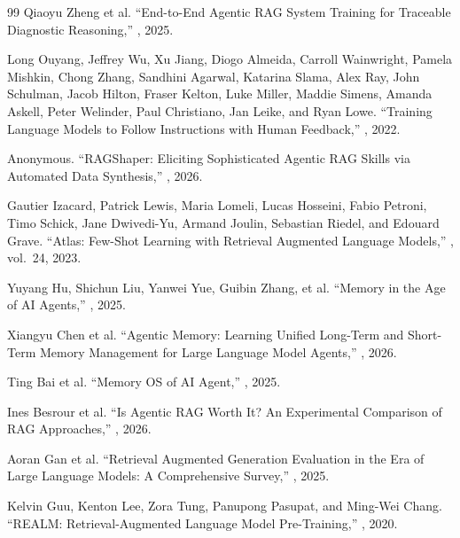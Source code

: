 \begin{thebibliography}{99}
Qiaoyu Zheng et al.
\newblock ``End-to-End Agentic RAG System Training for Traceable Diagnostic
Reasoning,''
, 2025.
 
Long Ouyang, Jeffrey Wu, Xu Jiang, Diogo Almeida, Carroll Wainwright,
Pamela Mishkin, Chong Zhang, Sandhini Agarwal, Katarina Slama, Alex Ray,
John Schulman, Jacob Hilton, Fraser Kelton, Luke Miller, Maddie Simens,
Amanda Askell, Peter Welinder, Paul Christiano, Jan Leike, and Ryan Lowe.
\newblock ``Training Language Models to Follow Instructions with Human Feedback,''
, 2022.
 
Anonymous.
\newblock ``RAGShaper: Eliciting Sophisticated Agentic RAG Skills via Automated
Data Synthesis,''
, 2026.
 
Gautier Izacard, Patrick Lewis, Maria Lomeli, Lucas Hosseini, Fabio Petroni,
Timo Schick, Jane Dwivedi-Yu, Armand Joulin, Sebastian Riedel, and Edouard Grave.
\newblock ``Atlas: Few-Shot Learning with Retrieval Augmented Language Models,''
, vol.~24, 2023.
 
Yuyang Hu, Shichun Liu, Yanwei Yue, Guibin Zhang, et al.
\newblock ``Memory in the Age of AI Agents,''
, 2025.
 
Xiangyu Chen et al.
\newblock ``Agentic Memory: Learning Unified Long-Term and Short-Term Memory
Management for Large Language Model Agents,''
, 2026.
 
Ting Bai et al.
\newblock ``Memory OS of AI Agent,''
, 2025.
 
Ines Besrour et al.
\newblock ``Is Agentic RAG Worth It? An Experimental Comparison of RAG Approaches,''
, 2026.
 
Aoran Gan et al.
\newblock ``Retrieval Augmented Generation Evaluation in the Era of Large Language
Models: A Comprehensive Survey,''
, 2025.
 
Kelvin Guu, Kenton Lee, Zora Tung, Panupong Pasupat, and Ming-Wei Chang.
\newblock ``REALM: Retrieval-Augmented Language Model Pre-Training,''
, 2020.
 

\end{thebibliography}
